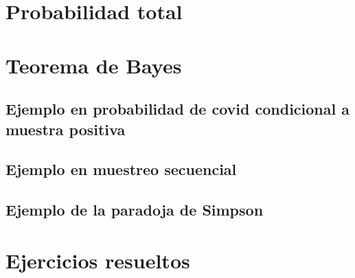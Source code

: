 \documentclass[
]{book}
\begin{document}
\hypertarget{probabilidad-total}{%
\section{Probabilidad total}\label{probabilidad-total}}

\hypertarget{teorema-de-bayes}{%
\section{Teorema de Bayes}\label{teorema-de-bayes}}

\hypertarget{ejemplo-en-probabilidad-de-covid-condicional-a-muestra-positiva}{%
\subsection{Ejemplo en probabilidad de covid condicional a muestra positiva}\label{ejemplo-en-probabilidad-de-covid-condicional-a-muestra-positiva}}

\hypertarget{ejemplo-en-muestreo-secuencial}{%
\subsection{Ejemplo en muestreo secuencial}\label{ejemplo-en-muestreo-secuencial}}

\hypertarget{ejemplo-de-la-paradoja-de-simpson}{%
\subsection{Ejemplo de la paradoja de Simpson}\label{ejemplo-de-la-paradoja-de-simpson}}

\hypertarget{ejercicios-resueltos-2}{%
\section{Ejercicios resueltos}\label{ejercicios-resueltos-2}}

  
\end{document}

